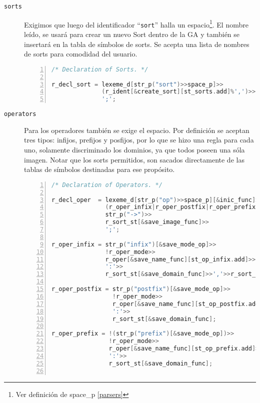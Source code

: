 \begin{description}
\item [\texttt{sorts}] Exigimos que luego del identificador ``\texttt{sort}'' halla un espacio\footnote{Ver definición de space\_p \ref{parsers}}. El nombre leído, se usará para crear un nuevo Sort dentro de la GA y también se insertará en la tabla de símbolos de sorts. Se acepta una lista de nombres de sorts para comodidad del usuario.

\begin{lstlisting}[language=C++, basicstyle=\scriptsize, numbers=left, numbersep=5pt, numberstyle=\tiny]
/* Declaration of Sorts. */

r_decl_sort = lexeme_d[str_p("sort")>>space_p]>>
              (r_ident[&create_sort][st_sorts.add]%',')>>
              ';';
\end{lstlisting}

\item [\texttt{operators}] Para los operadores también se exige el espacio. Por definición se aceptan tres tipos: infijos, prefijos y posfijos, por lo que se hizo una regla para cada uno, solamente discriminado los dominios, ya que todos poseen una sóla imagen. Notar que los sorts permitidos, son sacados directamente de las tablas de símbolos destinadas para ese propósito.

\begin{lstlisting}[language=C++, basicstyle=\scriptsize, numbers=left, numbersep=5pt, numberstyle=\tiny]
/* Declaration of Operators. */

r_decl_oper  = lexeme_d[str_p("op")>>space_p][&inic_func]>>
               (r_oper_infix|r_oper_postfix|r_oper_prefix)>>
               str_p("->")>>
               r_sort_st[&save_image_func]>>
               ';';

r_oper_infix = str_p("infix")[&save_mode_op]>>
               !r_oper_mode>>
               r_oper[&save_name_func][st_op_infix.add]>>
               ':'>>
               r_sort_st[&save_domain_func]>>','>>r_sort_st[&save_domain_func];

r_oper_postfix = str_p("postfix")[&save_mode_op]>>
                 !r_oper_mode>>
                 r_oper[&save_name_func][st_op_postfix.add]>>
                 ':'>>
                 r_sort_st[&save_domain_func];

r_oper_prefix = !(str_p("prefix")[&save_mode_op])>>
                !r_oper_mode>>
                r_oper[&save_name_func][st_op_prefix.add]>>
                ':'>>
                r_sort_st[&save_domain_func];


\end{lstlisting}
\end{description}
